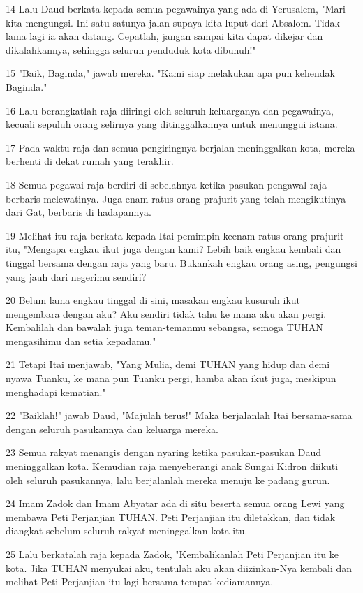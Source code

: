 \par 14 Lalu Daud berkata kepada semua pegawainya yang ada di Yerusalem, "Mari kita mengungsi. Ini satu-satunya jalan supaya kita luput dari Absalom. Tidak lama lagi ia akan datang. Cepatlah, jangan sampai kita dapat dikejar dan dikalahkannya, sehingga seluruh penduduk kota dibunuh!"
\par 15 "Baik, Baginda," jawab mereka. "Kami siap melakukan apa pun kehendak Baginda."
\par 16 Lalu berangkatlah raja diiringi oleh seluruh keluarganya dan pegawainya, kecuali sepuluh orang selirnya yang ditinggalkannya untuk menunggui istana.
\par 17 Pada waktu raja dan semua pengiringnya berjalan meninggalkan kota, mereka berhenti di dekat rumah yang terakhir.
\par 18 Semua pegawai raja berdiri di sebelahnya ketika pasukan pengawal raja berbaris melewatinya. Juga enam ratus orang prajurit yang telah mengikutinya dari Gat, berbaris di hadapannya.
\par 19 Melihat itu raja berkata kepada Itai pemimpin keenam ratus orang prajurit itu, "Mengapa engkau ikut juga dengan kami? Lebih baik engkau kembali dan tinggal bersama dengan raja yang baru. Bukankah engkau orang asing, pengungsi yang jauh dari negerimu sendiri?
\par 20 Belum lama engkau tinggal di sini, masakan engkau kusuruh ikut mengembara dengan aku? Aku sendiri tidak tahu ke mana aku akan pergi. Kembalilah dan bawalah juga teman-temanmu sebangsa, semoga TUHAN mengasihimu dan setia kepadamu."
\par 21 Tetapi Itai menjawab, "Yang Mulia, demi TUHAN yang hidup dan demi nyawa Tuanku, ke mana pun Tuanku pergi, hamba akan ikut juga, meskipun menghadapi kematian."
\par 22 "Baiklah!" jawab Daud, "Majulah terus!" Maka berjalanlah Itai bersama-sama dengan seluruh pasukannya dan keluarga mereka.
\par 23 Semua rakyat menangis dengan nyaring ketika pasukan-pasukan Daud meninggalkan kota. Kemudian raja menyeberangi anak Sungai Kidron diikuti oleh seluruh pasukannya, lalu berjalanlah mereka menuju ke padang gurun.
\par 24 Imam Zadok dan Imam Abyatar ada di situ beserta semua orang Lewi yang membawa Peti Perjanjian TUHAN. Peti Perjanjian itu diletakkan, dan tidak diangkat sebelum seluruh rakyat meninggalkan kota itu.
\par 25 Lalu berkatalah raja kepada Zadok, "Kembalikanlah Peti Perjanjian itu ke kota. Jika TUHAN menyukai aku, tentulah aku akan diizinkan-Nya kembali dan melihat Peti Perjanjian itu lagi bersama tempat kediamannya.
